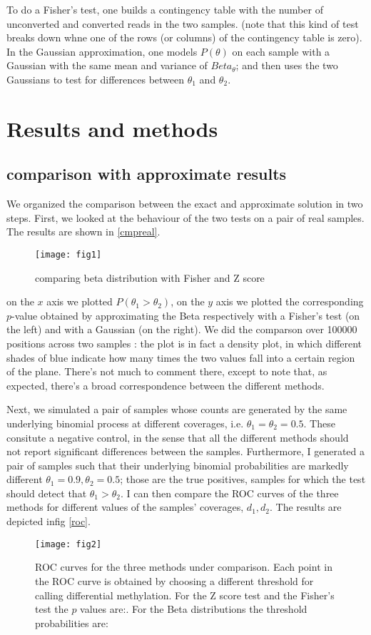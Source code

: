 \documentclass[11pt]{amsart}
\begin{document}
To do a Fisher's test, one builds a contingency table with the number of unconverted and converted reads in the two samples. (note that this kind of test breaks down whne one of the rows (or columns) of the contingency table is zero). In the Gaussian approximation, one models $P(\theta)$ on each sample with a Gaussian with the same mean and variance of $Beta_{\theta}$; and then uses the two Gaussians to test for differences between $\theta_1$ and $\theta_2$. 
\section{Results and methods} 
\subsection{comparison with approximate results}
We organized the comparison between the exact and approximate solution in two steps. First,
we looked at the behaviour of the two tests on a pair of real samples. The results are shown in \ref{cmpreal}.
\begin{figure}[h]
\caption{comparing beta distribution with Fisher and Z score}
\texttt{[image: fig1]}
\end{figure}\label{cmpreal}
on the $x$ axis we plotted $P(\theta_1>\theta_2)$, on the $y$ axis we plotted the corresponding $p$-value obtained by approximating the Beta respectively with a Fisher's test (on the left) and with a Gaussian (on the right).
We did the comparson over 100000 positions across two samples : the plot is in fact a density plot, in which different shades of blue indicate how many times the two values fall into a certain region of the plane. There's not much to comment there, except to note that, as expected, there's a broad correspondence between the different methods.

Next, we simulated a pair of samples whose counts are generated by the same underlying binomial process at different coverages, i.e. $\theta_1=\theta_2=0.5$. These consitute a negative control, in the sense that all the different methods should not report significant differences between the samples. Furthermore, I generated a pair of samples such that their underlying binomial probabilities are markedly different $\theta_1=0.9,\theta_2=0.5$; those are the true positives, samples for which the test should detect that $\theta_1>\theta_2$. I can then compare the ROC curves of the three methods for different values of the samples' coverages, $d_1,d_2$. 
The results are depicted infig \ref{roc}.
\begin{figure}[h]
\caption{ROC curves for the three methods under comparison. Each point in the ROC curve is obtained by choosing a different threshold for calling differential methylation. For the Z score test and the Fisher's test the $p$ values are:. For the Beta distributions the threshold probabilities are: }
\texttt{[image: fig2]}
\end{figure}\label{roc}
\end{document}
